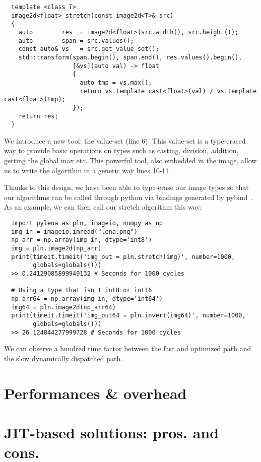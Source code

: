 \begin{verbatim}
  template <class T>
  image2d<float> stretch(const image2d<T>& src)
  {
    auto        res  = image2d<float>(src.width(), src.height());
    auto        span = src.values();
    const auto& vs   = src.get_value_set();
    std::transform(span.begin(), span.end(), res.values().begin(),
                   [&vs](auto val) -> float
                   {
                     auto tmp = vs.max();
                     return vs.template cast<float>(val) / vs.template cast<float>(tmp);
                   });
    return res;
  }
\end{verbatim}

We introduce a new tool: the value-set (line 6). This value-set is a type-erased way to provide basic operations on
types such as casting, division, addition, getting the global max etc. This powerful tool, also embedded in the image,
allow us to write the algorithm in a generic way lines 10-11.

Thanks to this design, we have been able to type-erase our image types so that our algorithms can be called through
python via bindings generated by pybind~\cite{jakob.2017.pybind11}. As an example, we can then call our stretch
algorithm this way:

\begin{verbatim}
  import pylena as pln, imageio, numpy as np
  img_in = imageio.imread("lena.png")
  np_arr = np.array(img_in, dtype='int8')
  img = pln.image2d(np_arr)
  print(timeit.timeit('img_out = pln.stretch(img)', number=1000,
        globals=globals()))
  >> 0.24129085899949132 # Seconds for 1000 cycles

  # Using a type that isn't int8 or int16
  np_arr64 = np.array(img_in, dtype='int64')
  img64 = pln.image2d(np_arr64)
  print(timeit.timeit('img_out64 = pln.invert(img64)', number=1000,
        globals=globals()))
  >> 26.124844277999728 # Seconds for 1000 cycles
\end{verbatim}

We can observe a hundred time factor between the fast and optimized path and the slow dynamically dispatched path.

\section{Performances \& overhead}


\section{JIT-based solutions: pros. and cons.}

